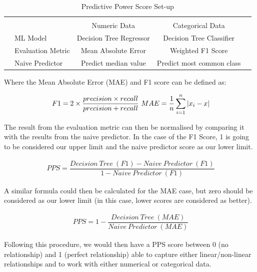 \begin{appendices}
{
\begin{table}[h!]
\centering
\begin{tabular}{l|l|c|c|c}
\multicolumn{2}{c}{}&\multicolumn{2}{c}{}&\\
\cline{3-4}
\multicolumn{2}{c|}{}&Numeric Data &Categorical Data &\multicolumn{1}{c}{}\\
\cline{2-4}
\multirow{}{}{}& ML Model & Decision Tree Regressor & Decision Tree Classifier & \\
\cline{2-4}
& Evaluation Metric & Mean Absolute Error & Weighted F1 Score & \\
\cline{2-4}
& Naive Predictor & Predict median value & Predict most common class & \\
\cline{2-4}
\end{tabular}
\caption{Predictive Power Score Set-up}
\label{setup}
\end{table}
}

Where the Mean Absolute Error (MAE) and F1 score can be defined as:

\useshortskip
\begin{align}
\ F1 = 2 \times \dfrac{precision \times recall}{precision + recall}
\ MAE = \dfrac{1}{n}\sum_{i=1}^{n}\abs{x_{i} - x}
\end{align}
\useshortskip

The result from the evaluation metric can then be normalised by comparing it with the results from the naive predictor. In the case of the F1 Score, 1 is going to be considered our upper limit and the naive predictor score as our lower limit.

\useshortskip
\begin{align}
\ PPS = \dfrac{Decision\:Tree\:(F1) - Naive\:Predictor\:(F1)}{1 - Naive\:Predictor\:(F1)}
\end{align}
\useshortskip

A similar formula could then be calculated for the MAE case, but zero should be considered as our lower limit (in this case, lower scores are considered as better).

\useshortskip
\begin{align}
\ PPS = 1 - \dfrac{Decision\:Tree\:(MAE)}{Naive\:Predictor\:(MAE)}
\end{align}
\useshortskip

Following this procedure, we would then have a PPS score between 0 (no relationship) and 1 (perfect relationship) able to capture either linear/non-linear relationships and to work with either numerical or categorical data. 


\end{appendices}
